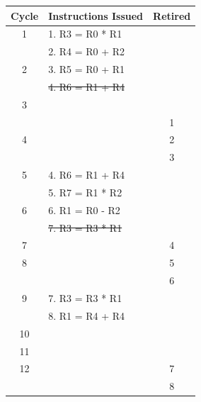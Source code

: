 \documentclass{article}
\begin{document}
\begin{enumerate}
    \begin{figure}[H]
        \centering
        \begin{minipage}[t]{0.45\textwidth}
            \centering
            \renewcommand{\arraystretch}{0.9} %
            \setlength{\tabcolsep}{3pt} %
            \begin{tabular}{|c|p{3.4cm}|c|}
                \hline
                \textbf{Cycle} & \textbf{Instructions Issued} & \textbf{Retired} \\ \hline
                1 & 1. R3 = R0 * R1 & \\ 
                  & 2. R4 = R0 + R2 & \\ \hline
                2 & 3. R5 = R0 + R1 & \\ 
                  & \sout{4. R6 = R1 + R4} & \\ \hline
                3 &                 & \\ \hline
                  &                 & 1 \\ 
                4 &                 & 2 \\ 
                  &                 & 3 \\ \hline
                5 & 4. R6 = R1 + R4 & \\
                  & 5. R7 = R1 * R2 & \\ \hline 
                6 & 6. R1 = R0 - R2 & \\ 
                  & \sout{7. R3 = R3 * R1} & \\ \hline 
                7 &                 & 4 \\ \hline 
                8 &                 & 5 \\ \hline 
                  &                 & 6 \\ \hline 
                9 & 7. R3 = R3 * R1 & \\ 
                  & 8. R1 = R4 + R4 & \\ \hline 
               10 &                 & \\ \hline 
               11 &                 & \\ \hline 
               12 &                 & 7 \\ 
                  &                 & 8 \\ \hline 
            \end{tabular}
        \end{minipage}
        \begin{minipage}[t]{0.45\textwidth}

\end{minipage}
\end{figure}
\end{enumerate}
\end{document}
